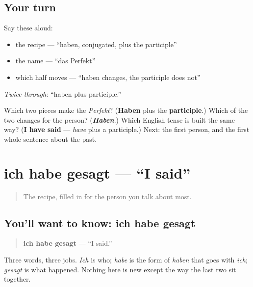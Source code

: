 \subsection*{Your turn}
Say these aloud:

\begin{itemize}
\raggedright
  \item the recipe — \textquotedblleft{}haben, conjugated, plus the participle\textquotedblright{}
  \item the name — \textquotedblleft{}das Perfekt\textquotedblright{}
  \item which half moves — \textquotedblleft{}haben changes, the participle does not\textquotedblright{}
\end{itemize}

\emph{Twice through:} \textquotedblleft{}haben plus participle.\textquotedblright{}

\begin{tcolorbox}[breakable,colback=teal!4,colframe=teal!35!black,title={Before you move on}]
Which two pieces make the \emph{Perfekt}? (\textbf{Haben} plus the \textbf{participle}.) Which of the two changes for the person? (\emph{\textbf{Haben}}.) Which English tense is built the same way? (\textbf{I have said} — \emph{have} plus a participle.) Next: the first person, and the first whole sentence about the past.
\end{tcolorbox}
\section[ich habe gesagt]{ich habe gesagt — \textquotedblleft{}I said\textquotedblright{}}

\label{lesson:GE-C15-ich-habe-gesagt}



\begin{quote}
The recipe, filled in for the person you talk about most.
\end{quote}

\subsection*{You'll want to know: ich habe gesagt}
\begin{quote}
\textbf{ich habe gesagt} — \textquotedblleft{}I said.\textquotedblright{}
\end{quote}

Three words, three jobs. \emph{Ich} is who; \emph{habe} is the form of \emph{haben} that goes with \emph{ich}; \emph{gesagt} is what happened. Nothing here is new except the way the last two sit together.

